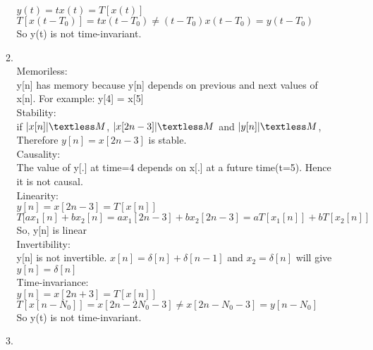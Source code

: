 \documentclass[10pt,a4paper, margin=1in]{article}
\begin{document}
\begin{enumerate}
\begin{enumerate}
    $y(t) = tx(t) = T[x(t)]$\\
    $T[x(t-T_0)] = tx(t-T_0) \ne (t-T_0)x(t- T_0) = y(t- T_0)$\\
    So y(t) is not time-invariant. \\
    
    
    
    
    
    \item %
    
    \ \\
    Memoriless:\\
    
    y[n] has memory because y[n] depends on previous  and next values of x[n]. For example:  y[4] = x[5]\\
    
    Stability: \\
    
    if $|x[n]|\textless M$, $|x[2n-3]|\textless M$ and $|y[n]|\textless M$, Therefore
    $y[n] = x[2n-3]$ is stable.\\
    
    Causality:\\
    
    The value of y[.] at time=4 depends on x[.] at a future time(t=5). Hence it is not causal.\\
    
    Linearity:\\
    
    $y[n] = x[2n-3] = T[x[n]]$\\
    $T[ax_1[n] + bx_2[n] = ax_1[2n-3] + bx_2[2n-3] = aT[x_1[n]] + bT[x_2[n]]$\\
    So, y[n] is linear\\
    
    Invertibility:\\
    
    y[n] is not invertible. $x[n] = \delta[n] + \delta[n-1]$ and $ x_2 = \delta[n]$ will give $y[n] = \delta[n]$\\
    
    Time-invariance:\\
    
    $y[n] = x[2n+3] = T[x[n]]$\\
    $T[x[n-N_0]] = x[2n-2N_0 - 3] \ne x[2n-N_0 - 3] = y[n - N_0]$\\
    So y(t) is not time-invariant. \\
    
    
    \item %
    

\end{enumerate}
\end{enumerate}
\end{document}
